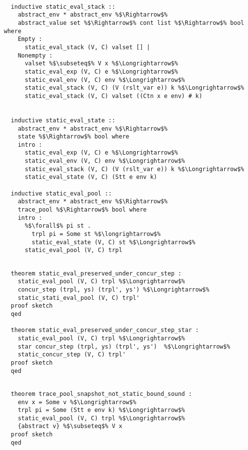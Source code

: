 \begin{lstlisting}[style=codestyle1, escapechar=\%]

  inductive static_eval_stack ::
    abstract_env * abstract_env %$\Rightarrow$%
    abstract_value set %$\Rightarrow$% cont list %$\Rightarrow$% bool where
    Empty :
      static_eval_stack (V, C) valset [] |
    Nonempty : 
      valset %$\subseteq$% V x %$\Longrightarrow$%
      static_eval_exp (V, C) e %$\Longrightarrow$%
      static_eval_env (V, C) env %$\Longrightarrow$%
      static_eval_stack (V, C) (V (rslt_var e)) k %$\Longrightarrow$%
      static_eval_stack (V, C) valset ((Ctn x e env) # k)


  inductive static_eval_state ::
    abstract_env * abstract_env %$\Rightarrow$%
    state %$\Rightarrow$% bool where
    intro :
      static_eval_exp (V, C) e %$\Longrightarrow$%
      static_eval_env (V, C) env %$\Longrightarrow$%
      static_eval_stack (V, C) (V (rslt_var e)) k %$\Longrightarrow$%
      static_eval_state (V, C) (Stt e env k)

  inductive static_eval_pool ::
    abstract_env * abstract_env %$\Rightarrow$%
    trace_pool %$\Rightarrow$% bool where
    intro :
      %$\forall$% pi st .
        trpl pi = Some st %$\longrightarrow$%
        static_eval_state (V, C) st %$\Longrightarrow$% 
      static_eval_pool (V, C) trpl

  \end{lstlisting}

\begin{lstlisting}[style=codestyle1, escapechar=\%]

  theorem static_eval_preserved_under_concur_step :
    static_eval_pool (V, C) trpl %$\Longrightarrow$% 
    concur_step (trpl, ys) (trpl', ys') %$\Longrightarrow$%
    static_stati_eval_pool (V, C) trpl'
  proof sketch
  qed

  theorem static_eval_preserved_under_concur_step_star :
    static_eval_pool (V, C) trpl %$\Longrightarrow$% 
    star concur_step (trpl, ys) (trpl', ys')  %$\Longrightarrow$% 
    static_concur_step (V, C) trpl'
  proof sketch
  qed
  \end{lstlisting}

\begin{lstlisting}[style=codestyle1, escapechar=\%]

  theorem trace_pool_snapshot_not_static_bound_sound :
    env x = Some v %$\Longrightarrow$%
    trpl pi = Some (Stt e env k) %$\Longrightarrow$%
    static_eval_pool (V, C) trpl %$\Longrightarrow$%
    {abstract v} %$\subseteq$% V x
  proof sketch
  qed
  \end{lstlisting}

